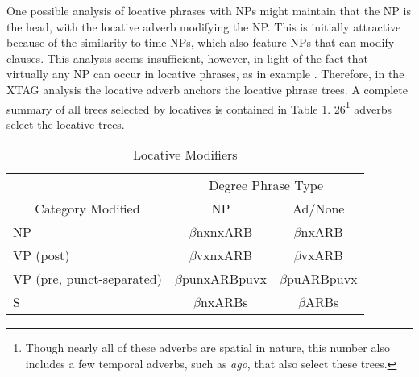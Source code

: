 One possible analysis of locative phrases with NPs might maintain that 
the NP is the head, with the locative adverb modifying the NP. This is 
initially attractive because of the similarity to time NPs, which also 
feature NPs that can modify clauses. This analysis seems insufficient, 
however, in light of the fact that virtually any NP can occur in 
locative phrases, as in example . Therefore, in the XTAG analysis 
the locative adverb anchors the locative phrase trees. A complete summary 
of all trees selected by locatives is contained in Table \ref{loc-summary}. 
26\footnote{Though nearly all of these adverbs are spatial in nature, 
this number also includes a few temporal adverbs, such as {\it ago}, 
that also select these trees.} adverbs select the locative trees.


\begin{table}[htb]
\centering
\begin{tabular}{|l||c|c|}
\hline
\multicolumn{1}{|c||}{}&
\multicolumn{2}{|c|}{Degree Phrase Type}\\
\cline{2-3}
\multicolumn{1}{|c||}{Category Modified}&NP&Ad/None\\
\hline
\hline
NP&$\beta$nxnxARB&$\beta$nxARB\\
\hline
VP (post)&$\beta$vxnxARB&$\beta$vxARB\\
\hline
VP (pre, punct-separated)&$\beta$punxARBpuvx&$\beta$puARBpuvx\\
\hline
S&$\beta$nxARBs&$\beta$ARBs\\
\hline
\end{tabular}
\caption{Locative Modifiers}
\label{loc-summary}
\end{table}






